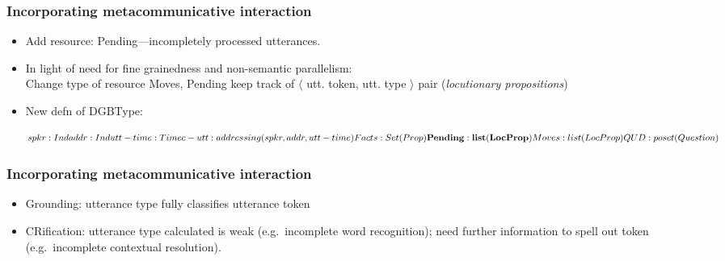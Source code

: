 \documentclass{beamer}
\begin{document}
\begin{frame}\frametitle{Incorporating metacommunicative interaction}

\begin{itemize}

\item Add resource: Pending---incompletely processed utterances.

\item In light of need for  fine grainedness and non-semantic parallelism:\\
Change type of resource
 Moves, Pending keep track of
$ \langle$ utt. token, utt. type $\rangle$ pair ({\it locutionary propositions})


\item New defn of DGBType:

\begin{avm}\[spkr: Ind\\
                             addr: Ind\\
                             utt-time: Time\\
                           c-utt : addressing(spkr,addr,utt-time)\\
                        Facts : Set(Prop)\\
                      {\bf  Pending :  list(LocProp)}\\
                           Moves : list(LocProp)\\
                           QUD : poset(Question)\]\end{avm}
      

\end{itemize}\end{frame}



\begin{frame}\frametitle{Incorporating metacommunicative interaction}

\begin{itemize}


\item Grounding: utterance type fully classifies utterance token

\item CRification: utterance type calculated is weak (e.g.\ incomplete
  word recognition); need further
  information to spell out token (e.g.\ incomplete contextual resolution).

\end{itemize}
\end{frame}
\end{document}
